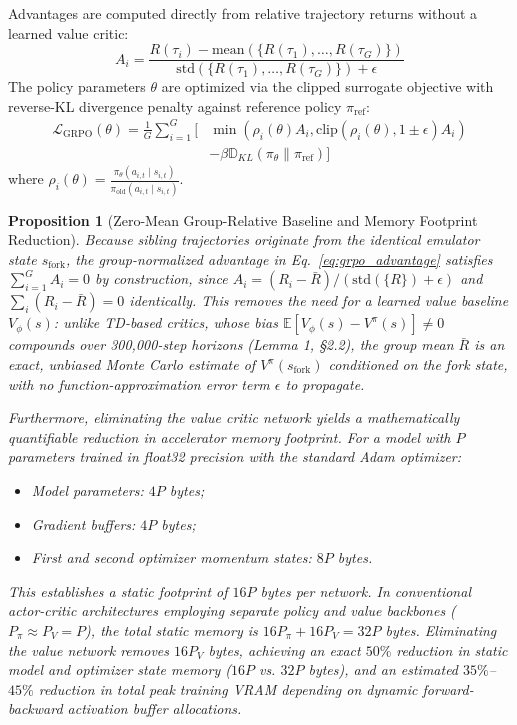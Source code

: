 \documentclass[journal,10pt,twocolumn]{IEEEtran}
\newtheorem{proposition}{Proposition}
\begin{document}
Advantages are computed directly from relative trajectory returns without a learned value critic:
\begin{equation}
\label{eq:grpo_advantage}
A_i = \frac{R(\tau_i) - \text{mean}\left(\{R(\tau_1), \dots, R(\tau_G)\}\right)}{\text{std}\left(\{R(\tau_1), \dots, R(\tau_G)\}\right) + \epsilon}
\end{equation}
The policy parameters $\theta$ are optimized via the clipped surrogate objective with reverse-KL divergence penalty against reference policy $\pi_{\text{ref}}$:
\begin{equation}
\label{eq:grpo_loss}
\begin{split}
\mathcal{L}_{\text{GRPO}}(\theta) = \frac{1}{G} \sum_{i=1}^G \Big[ &\min\left( \rho_i(\theta) A_i, \text{clip}(\rho_i(\theta), 1\pm\epsilon) A_i \right) \\
&- \beta \mathbb{D}_{KL}(\pi_\theta \parallel \pi_{\text{ref}}) \Big]
\end{split}
\end{equation}
where $\rho_i(\theta) = \frac{\pi_\theta(a_{i, t} \mid s_{i, t})}{\pi_{\text{old}}(a_{i, t} \mid s_{i, t})}$. 

\begin{proposition}[Zero-Mean Group-Relative Baseline and Memory Footprint Reduction]
\label{prop:grpo_zeromean}
Because sibling trajectories originate from the identical emulator state $s_{\text{fork}}$, the group-normalized advantage in Eq.~\eqref{eq:grpo_advantage} satisfies $\sum_{i=1}^G A_i = 0$ by construction, since $A_i = (R_i - \bar{R})/(\text{std}(\{R\}) + \epsilon)$ and $\sum_i (R_i - \bar{R}) = 0$ identically. This removes the need for a learned value baseline $V_\phi(s)$: unlike TD-based critics, whose bias $\mathbb{E}[V_\phi(s) - V^\pi(s)] \ne 0$ compounds over 300,000-step horizons (Lemma 1, \S2.2), the group mean $\bar{R}$ is an exact, unbiased Monte Carlo estimate of $V^\pi(s_{\text{fork}})$ conditioned on the fork state, with no function-approximation error term $\epsilon$ to propagate.

Furthermore, eliminating the value critic network yields a mathematically quantifiable reduction in accelerator memory footprint. For a model with $P$ parameters trained in float32 precision with the standard Adam optimizer:
\begin{itemize}
    \item Model parameters: $4P$ bytes;
    \item Gradient buffers: $4P$ bytes;
    \item First and second optimizer momentum states: $8P$ bytes.
\end{itemize}
This establishes a static footprint of $16P$ bytes per network. In conventional actor-critic architectures employing separate policy and value backbones ($P_\pi \approx P_V = P$), the total static memory is $16P_\pi + 16P_V = 32P$ bytes. Eliminating the value network removes $16P_V$ bytes, achieving an exact $50\%$ reduction in static model and optimizer state memory ($16P$ vs. $32P$ bytes), and an estimated $35\%$--$45\%$ reduction in total peak training VRAM depending on dynamic forward-backward activation buffer allocations.
\end{proposition}
\end{document}

